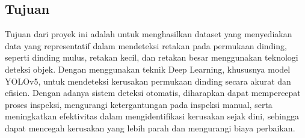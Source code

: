 \documentclass[12pt,a4paper]{article}
\begin{document}
\subsection{Tujuan}
\begin{adjustwidth}{3em}{0pt} 
\hspace{0.5cm} Tujuan dari proyek ini adalah untuk menghasilkan dataset yang menyediakan data yang representatif dalam mendeteksi retakan pada permukaan dinding, seperti dinding mulus, retakan kecil, dan retakan besar menggunakan teknologi deteksi objek. Dengan menggunakan teknik Deep Learning, khususnya model YOLOv5, untuk mendeteksi kerusakan permukaan dinding secara akurat dan efisien. Dengan adanya sistem deteksi otomatis, diharapkan dapat mempercepat proses inspeksi, mengurangi ketergantungan pada inspeksi manual, serta meningkatkan efektivitas dalam mengidentifikasi kerusakan sejak dini, sehingga dapat mencegah kerusakan yang lebih parah dan mengurangi biaya perbaikan.
\end{adjustwidth}

\end{document}
